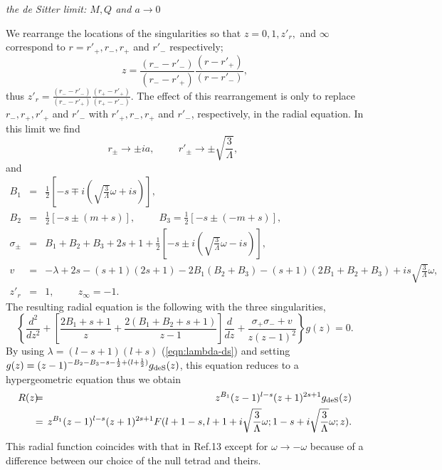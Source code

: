 \noindent
{\it the de Sitter limit: $M, Q$ and $a \rightarrow 0$}

We rearrange the locations of the singularities so that 
$z=0, 1, z'_r,$ and $\infty$ correspond to $r=r'_+, r_-, r_+$ and 
$r'_-$ respectively;
%
\begin{equation}
z=\frac{(r_- -r'_-)}{(r_- -r'_+)}\frac{(r -r'_+)}{(r-r'_-)},
\end{equation}
%
thus $\displaystyle{z'_r=\frac{(r_- -r'_-)}{(r_- -r'_+)}
\frac{(r_+ -r'_+)}{(r_+ -r'_-)}}$.
The effect of this rearrangement is only to replace $r_-, r_+, r'_+$ 
and $r'_-$ with $r'_+, r_-, r_+$ and $r'_-$, respectively, 
in the radial equation.
In this limit we find 
%
\begin{equation} 
r_\pm \rightarrow \pm ia, \hspace{1cm} 
r'_\pm \rightarrow \pm \sqrt{\frac{3}{\Lambda}}, \hspace{1cm}
\end{equation}
%
and 
%
\begin{eqnarray}
B_1 &=& \frac{1}{2}      
\left[-s \mp
i\left(\sqrt{\frac{3}{\Lambda}}\omega+is\right)\right],
\nonumber  \\
B_2 &=& \frac{1}{2}\left[-s \pm (m+s)\right], \hspace{1cm}
B_3=\frac{1}{2}\left[-s \pm (-m+s)\right], \nonumber \\
       \sigma_\pm &=& B_1+B_2+B_3+2s+1
          +\frac{1}{2}\left[-s \pm i 
              \left(\sqrt{\frac{3}{\Lambda}}\omega-is\right)\right],  \\ 
v &=& -\lambda+2s-(s+1)(2s+1)-2B_1(B_2+B_3)-(s+1)(2B_1+B_2+B_3)
         +is\sqrt{\frac{3}{\Lambda}}\omega, \nonumber \\ z'_r &=& 1,  
\hspace{1cm}  z_\infty=-1. \nonumber \end{eqnarray}
%
The resulting radial equation is the following 
with the three singularities,
%
\begin{equation}
\left\{\frac{d^2}{dz^2}
+\left[\frac{2B_1+s+1}{z}+\frac{2(B_1+B_2+s+1)}{z-1}\right]
\frac{d}{dz} +\frac{\sigma_+\sigma_- +v}{z(z-1)^2}\right\}g(z)=0.
\end{equation}
%
By using $\lambda=(l-s+1)(l+s)$ (\ref{eqn:lambda-ds}) and setting  
$\displaystyle{g(z)=(z-1)^{-B_2-B_3-s-\frac{1}{2}+(l+\frac{1}{2})} 
g_{\mbox{{\scriptsize deS}}}(z)}$, 
this equation reduces to a hypergeometric equation thus we obtain  
%
\begin{eqnarray}
R(z) \makebox[-2mm]{}&=&\makebox[-2mm]{}
z^{B_1} (z-1)^{l-s} (z+1)^{2s+1} g_{\mbox{{\scriptsize deS}}}(z) 
\nonumber \\
\makebox[-2mm]{}&=&\makebox[-2mm]{}
z^{B_1} (z-1)^{l-s} (z+1)^{2s+1} 
F(l+1-s,l+1+i\sqrt{\frac{3}{\Lambda}}\omega;
1-s+i\sqrt{\frac{3}{\Lambda}}\omega;z).
\end{eqnarray}
%
This radial function coincides with that in Ref.13 except for 
$\omega \rightarrow -\omega$ because of a difference between 
our choice of the null tetrad and theirs.

